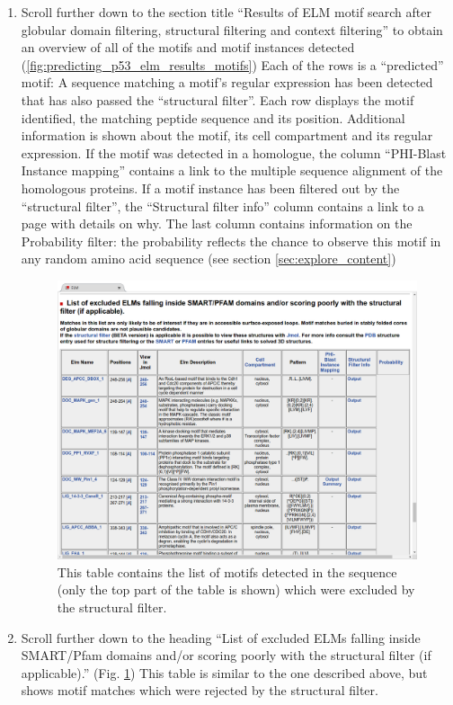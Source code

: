 \documentclass[12pt]{article}
\begin{document}
\begin{enumerate}
\item Scroll further down to the section title ``Results of ELM motif search
	after globular domain filtering, structural filtering and context
	filtering'' to obtain an overview of all of the motifs and motif
	instances detected
	(\ref{fig:predicting_p53_elm_results_motifs})
	Each of the rows is a ``predicted'' motif: A sequence matching a
	motif's regular expression has been detected that has also passed the
	``structural filter''.
	Each row displays the motif identified, the matching peptide
	sequence and its position. Additional information is shown about the
	motif, its cell compartment and its regular expression. If the motif
	was detected in a homologue, the column ``PHI-Blast Instance
	mapping'' contains a link to the multiple sequence alignment of the
	homologous proteins. If a motif instance has been filtered out 
	by the ``structural filter'', the ``Structural filter info'' column
	contains a link to a page with details on why.
	The last column contains information on the Probability filter: the
	probability reflects the chance to observe this motif in any random
	amino acid sequence (see section \ref{sec:explore_content})

\begin{figure}[h!]
\centering
	\includegraphics[width=\textwidth]{Figures/predicting_p53/elm_results_motifs_filtered.png}
	\caption{
	This table contains the list of motifs detected in the sequence (only
	the top part of the table is shown) which were excluded by the
	structural filter.
	}
	\label{fig:predicting_p53_elm_results_motifs_filtered}
\end{figure}

\item Scroll further down to the heading ``List of excluded ELMs falling inside
	SMART/Pfam domains and/or scoring poorly with the structural filter (if
	applicable).''
	(Fig.  \ref{fig:predicting_p53_elm_results_motifs_filtered})
	This table is similar to the one described above, but shows motif
	matches which were rejected by the structural filter.
	
\end{enumerate}
\end{document}
